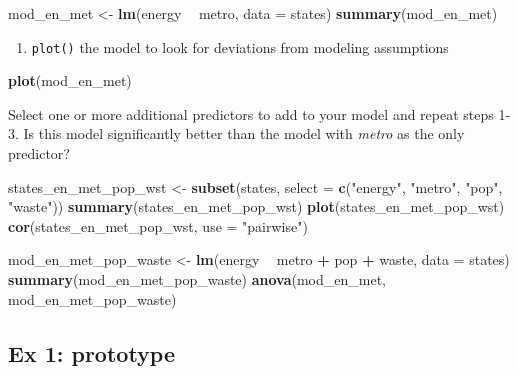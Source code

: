 \documentclass[]{book}
\newenvironment{Shaded}{\begin{snugshade}}{\end{snugshade}}
\newcommand{\KeywordTok}[1]{\textcolor[rgb]{0.13,0.29,0.53}{\textbf{#1}}}
\newcommand{\DataTypeTok}[1]{\textcolor[rgb]{0.13,0.29,0.53}{#1}}
\newcommand{\StringTok}[1]{\textcolor[rgb]{0.31,0.60,0.02}{#1}}
\newcommand{\OperatorTok}[1]{\textcolor[rgb]{0.81,0.36,0.00}{\textbf{#1}}}
\newcommand{\NormalTok}[1]{#1}
\providecommand{\tightlist}{%
  \setlength{\itemsep}{0pt}\setlength{\parskip}{0pt}}
\begin{document}
\begin{Shaded}
\begin{Highlighting}[]
\NormalTok{  mod_en_met <-}\StringTok{ }\KeywordTok{lm}\NormalTok{(energy }\OperatorTok{~}\StringTok{ }\NormalTok{metro, }\DataTypeTok{data =}\NormalTok{ states)}
  \KeywordTok{summary}\NormalTok{(mod_en_met)}
\end{Highlighting}
\end{Shaded}

\begin{enumerate}
\def\labelenumi{\arabic{enumi}.}
\setcounter{enumi}{2}
\tightlist
\item
  \texttt{plot()} the model to look for deviations from modeling
  assumptions
\end{enumerate}

\begin{Shaded}
\begin{Highlighting}[]
  \KeywordTok{plot}\NormalTok{(mod_en_met)}
\end{Highlighting}
\end{Shaded}

Select one or more additional predictors to add to your model and repeat
steps 1-3. Is this model significantly better than the model with
\emph{metro} as the only predictor?

\begin{Shaded}
\begin{Highlighting}[]
\NormalTok{  states_en_met_pop_wst <-}\StringTok{ }\KeywordTok{subset}\NormalTok{(states, }\DataTypeTok{select =} \KeywordTok{c}\NormalTok{(}\StringTok{"energy"}\NormalTok{, }\StringTok{"metro"}\NormalTok{, }\StringTok{"pop"}\NormalTok{, }\StringTok{"waste"}\NormalTok{))}
  \KeywordTok{summary}\NormalTok{(states_en_met_pop_wst)}
  \KeywordTok{plot}\NormalTok{(states_en_met_pop_wst)}
  \KeywordTok{cor}\NormalTok{(states_en_met_pop_wst, }\DataTypeTok{use =} \StringTok{"pairwise"}\NormalTok{)}

\NormalTok{  mod_en_met_pop_waste <-}\StringTok{ }\KeywordTok{lm}\NormalTok{(energy }\OperatorTok{~}\StringTok{ }\NormalTok{metro }\OperatorTok{+}\StringTok{ }\NormalTok{pop }\OperatorTok{+}\StringTok{ }\NormalTok{waste, }\DataTypeTok{data =}\NormalTok{ states)}
  \KeywordTok{summary}\NormalTok{(mod_en_met_pop_waste)}
  \KeywordTok{anova}\NormalTok{(mod_en_met, mod_en_met_pop_waste)}
\end{Highlighting}
\end{Shaded}

\subsection{Ex 1: prototype}\label{ex-1-prototype-1}
\end{document}
